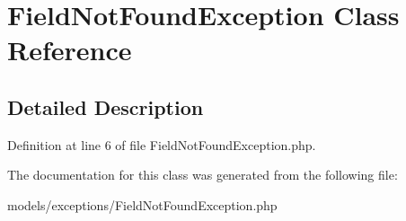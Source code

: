 \hypertarget{class_field_not_found_exception}{
\section{FieldNotFoundException Class Reference}
\label{class_field_not_found_exception}
}


\subsection{Detailed Description}


Definition at line 6 of file FieldNotFoundException.php.



The documentation for this class was generated from the following file:\begin{DoxyCompactItemize}
\item 
models/exceptions/FieldNotFoundException.php\end{DoxyCompactItemize}
